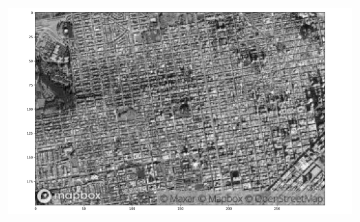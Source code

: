 \documentclass[
  letterpaper,
  DIV=11,
  numbers=noendperiod]{scrreprt}
\begin{document}
\begin{figure}

\begin{minipage}{0.33\linewidth}

\begin{figure}[H]

{\centering \includegraphics{images/plots/aerial_cities/0.jpg}

}


\end{figure}%

\end{minipage}%
%
\begin{minipage}{0.33\linewidth}

\begin{figure}[H]


\end{figure}
\end{minipage}
\end{figure}
\end{document}
